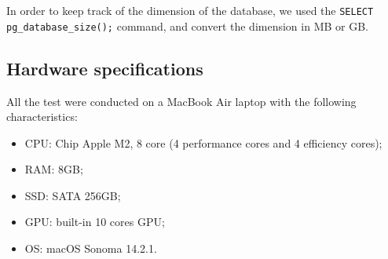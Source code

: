 In order to keep track of the dimension of the database, we used the 
\verb|SELECT| \\
\verb|pg_database_size();| command, and convert the dimension in MB or GB.

\subsection{Hardware specifications}

All the test were conducted on a MacBook Air laptop with the following characteristics:
\begin{itemize}
    \item CPU: Chip Apple M2, 8 core (4 performance cores and 4 efficiency cores);
    \item RAM: 8GB;
    \item SSD: SATA 256GB;
    \item GPU: built-in 10 cores GPU;
    \item OS: macOS Sonoma 14.2.1.
\end{itemize}